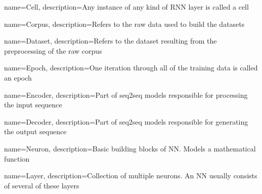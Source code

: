
{
	name={Cell},
	description={Any instance of any kind of RNN layer is called a cell}
}

{
	name={Corpus},
	description={Refers to the raw data used to build the datasets}
}

{
	name={Dataset},
	description={Refers to the dataset resulting from the preprocessing of the raw corpus}
}

{
  name={Epoch},
  description={One iteration through all of the training data is called an epoch}
}

{
	name={Encoder},
	description={Part of seq2seq models responsible for processing the input sequence}
}

{
	name={Decoder},
	description={Part of seq2seq models responsible for generating the output sequence}
}

{
  name={Neuron},
  description={Basic building blocks of NN. Models a mathematical function}
}

{
  name={Layer},
  description={Collection of multiple neurons. An NN usually consists of several of these layers}
}



